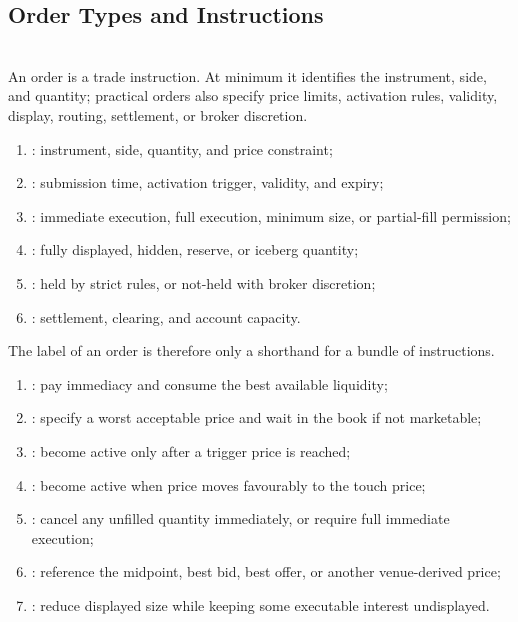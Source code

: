 \subsection{Order Types and Instructions}

\begin{definition} \\
An order is a trade instruction. At minimum it identifies the instrument, side, and quantity; practical orders also specify price limits, activation rules, validity, display, routing, settlement, or broker discretion.
\end{definition}

\begin{taxonomy} 
\begin{enumerate}[label=\roman*.]
\setlength{\itemsep}{0pt}
\item {}: instrument, side, quantity, and price constraint;
\item {}: submission time, activation trigger, validity, and expiry;
\item {}: immediate execution, full execution, minimum size, or partial-fill permission;
\item {}: fully displayed, hidden, reserve, or iceberg quantity;
\item {}: held by strict rules, or not-held with broker discretion;
\item {}: settlement, clearing, and account capacity.
\end{enumerate}
The label of an order is therefore only a shorthand for a bundle of instructions.
\end{taxonomy}

\begin{taxonomy} 
\begin{enumerate}[label=\roman*.]
\setlength{\itemsep}{0pt}
\item {}: pay immediacy and consume the best available liquidity;
\item {}: specify a worst acceptable price and wait in the book if not marketable;
\item {}: become active only after a trigger price is reached;
\item {}: become active when price moves favourably to the touch price;
\item {}: cancel any unfilled quantity immediately, or require full immediate execution;
\item {}: reference the midpoint, best bid, best offer, or another venue-derived price;
\item {}: reduce displayed size while keeping some executable interest undisplayed.
\end{enumerate}
\end{taxonomy}

